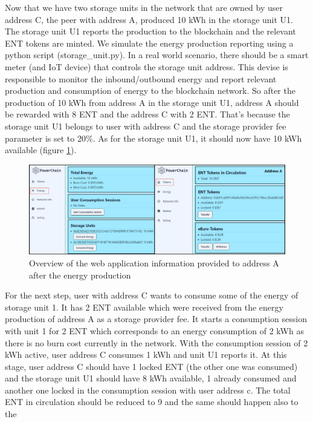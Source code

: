 Now that we have two storage units in the network that are owned by user address C, the peer with address A, produced 10 kWh in the storage unit U1. The storage unit U1
reports the production to the blockchain and the relevant ENT tokens are minted. We simulate the energy production reporting using a python script (storage\_unit.py). In a real world scenario, there should be
a smart meter (and IoT device) that controls the storage unit address. This devise is responsible to monitor the inbound/outbound energy and report relevant production and consumption of energy to the blockchain network.
So after the production of 10 kWh from address A in the storage unit U1, address A should be rewarded with 8 ENT and the address C with 2 ENT. 
That's because the storage unit U1 belongs to user with address C and the storage provider fee parameter is set to 20\%.
As for the storage unit U1, it should now have 10 kWh available (figure \ref{fig:energy_produced}).\\
\begin{figure}[h!]
    \centering
    \includegraphics[width=\linewidth,frame,scale=1]{Figures/energy_produced.png}
    \caption{Overview of the web application information provided to address A after the energy production}
    \label{fig:energy_produced}
\end{figure}
For the next step, user with address C wants to consume some of the energy of storage unit 1. It has 2 ENT available which were received from the energy production of address A as a storage provider fee.
It starts a consumption session with unit 1 for 2 ENT which corresponds to an energy consumption of 2 kWh as there is no burn cost currently in the network.
With the consumption session of 2 kWh active, user address C consumes 1 kWh and unit U1 reports it. At this stage, user address C should have 1 locked ENT (the other one was consumed) and the storage unit U1
should have 8 kWh available, 1 already consumed and another one locked in the consumption session with user address c. The total ENT in circulation should be reduced to 9 and the same should happen also to the
